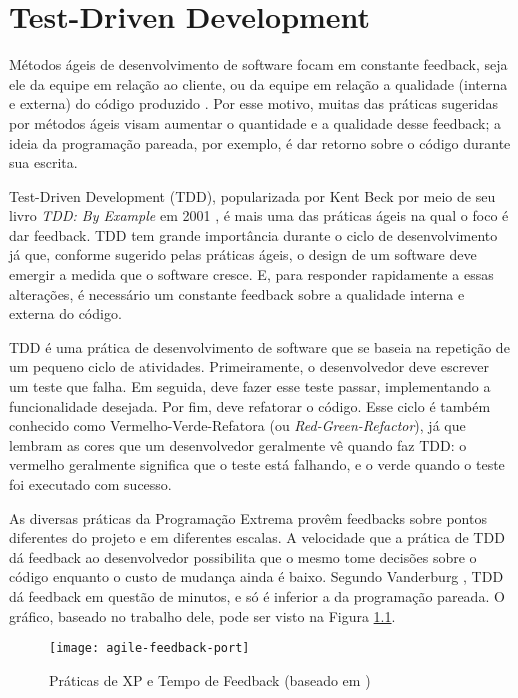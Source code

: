 \chapter{Test-Driven Development}
\label{cap:tdd}

Métodos ágeis de desenvolvimento de software focam em constante
feedback, seja ele da equipe em relação ao cliente, ou da equipe em relação a
qualidade (interna e externa) do código produzido \cite{AgileManifesto}. Por
esse motivo, muitas das práticas sugeridas por métodos ágeis visam aumentar o 
quantidade e a qualidade desse feedback; a ideia da programação pareada, por
exemplo, é dar retorno sobre o código durante sua escrita.

Test-Driven Development (TDD), popularizada por Kent Beck por meio de seu livro
\textit{TDD: By Example} em 2001 \cite{TDDByExample}, é mais uma das práticas
ágeis na qual o foco é dar feedback. TDD tem grande importância durante o ciclo
de desenvolvimento já que, conforme sugerido pelas práticas ágeis, o design de um
software deve emergir a medida que o software cresce. E, para responder
rapidamente a essas alterações, é necessário um constante feedback sobre a
qualidade interna e externa do código.

TDD é uma prática de desenvolvimento de software que se baseia na repetição de
um pequeno ciclo de atividades. Primeiramente, o desenvolvedor deve escrever um
teste que falha. Em seguida, deve fazer esse teste passar, implementando a
funcionalidade desejada. Por fim, deve refatorar o código. Esse ciclo
é também conhecido como 
Vermelho-Verde-Refatora (ou \textit{Red-Green-Refactor}), já que lembram as cores que um 
desenvolvedor geralmente vê quando faz TDD: o vermelho geralmente significa que
o teste está falhando, e o verde quando o teste foi executado com sucesso.

As diversas práticas da Programação Extrema provêm feedbacks sobre pontos diferentes 
do projeto e em diferentes escalas. 
A velocidade que a prática de TDD dá feedback ao desenvolvedor possibilita que o mesmo
tome decisões sobre o código enquanto o custo de mudança ainda é
baixo. Segundo Vanderburg \cite{vanderburg}, TDD dá feedback em questão de
minutos, e só é inferior a da programação pareada. O gráfico,
baseado no trabalho dele, pode ser visto na Figura
\ref{fig:agile-feedback}.

\begin{figure}
  \centering
  \texttt{[image: agile-feedback-port]}
  \caption{Práticas de XP e Tempo de Feedback (baseado em \cite{vanderburg})}
  \label{fig:agile-feedback}
\end{figure}

